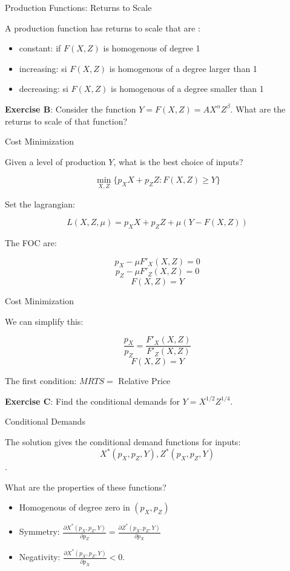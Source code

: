 \documentclass[handout]{beamer}
\begin{document}
\begin{frame}{Production Functions: Returns to Scale} 

A production function has returns to scale that are :

\begin{itemize}
\item constant: if $F(X,Z)$ is homogenous of degree 1
\item increasing: si $F(X,Z)$ is homogenous of a degree larger than 1
\item decreasing: si $F(X,Z)$ is homogenous of a degree smaller than 1
\end{itemize}

\textbf{Exercise B}: Consider the function $Y=F(X,Z)=A X^\alpha Z^\beta$. What are the returns to scale of that function?

\end{frame}

\begin{frame}{Cost Minimization} 

Given a level of production $Y$, what is the best choice of inputs?

$$ \min_{X,Z} \{ p_X X + p_Z Z : F(X,Z) \ge Y \}$$

Set the lagrangian: 

$$ L(X,Z,\mu) = p_X X + p_Z Z + \mu(Y - F(X,Z))$$

The FOC are:

$$ p_X - \mu F'_X(X,Z) = 0 $$
$$ p_Z - \mu F'_Z(X,Z) = 0 $$
$$ F(X,Z) = Y $$

\end{frame}

\begin{frame}{Cost Minimization} 

We can simplify this:

$$ \frac{p_X}{p_Z} = \frac{F'_X(X,Z)}{F'_Z(X,Z)} $$
$$ F(X,Z) = Y $$

The first condition: $MRTS = $ Relative Price

\textbf{Exercise C}: Find the conditional demands for $Y=X^{1/2} Z^{1/4}$. 
\end{frame}

\begin{frame}{Conditional Demands} 

The solution gives the conditional demand functions for inputs: $$X^*(p_X,p_Z,Y),Z^*(p_X,p_Z,Y)$$. 

What are the properties of these functions?
\begin{itemize}
\item Homogenous of degree zero in $(p_X,p_Z)$
\item Symmetry: $\frac{\partial X^*(p_X,p_Z,Y)}{\partial p_Z} = \frac{\partial Z^*(p_X,p_Z,Y)}{\partial p_X}$
\item Negativity: $\frac{\partial X^*(p_X,p_Z,Y)}{\partial p_X}<0$. 
\end{itemize}
\end{frame}
\end{document}
